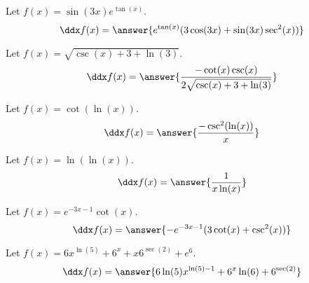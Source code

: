 \documentclass{ximera}
\begin{document}
\begin{shuffle}
\begin{exercise}
Let $f(x)=\sin (3 x) e^{\tan (x)}$.
\[
\ddx f(x) = \answer{e^{\tan (x)} (3 \cos (3 x)+\sin (3 x) \sec ^2(x))}
\]
\end{exercise}

\begin{exercise}
Let $f(x)=\sqrt{\csc (x)+3+\ln (3)}$.
\[
\ddx f(x) = \answer{\frac{-\cot (x) \csc (x)}{2 \sqrt{\csc (x)+3+\ln (3)}}}
\]
\end{exercise}

\begin{exercise}
Let $f(x)=\cot (\ln (x))$.
\[
\ddx f(x) = \answer{\frac{-\csc ^2(\ln (x))}{x}}
\]
\end{exercise}

\begin{exercise}
Let $f(x)=\ln (\ln (x))$.
\[
\ddx f(x) = \answer{\frac{1}{x \ln (x)}}
\]
\end{exercise}

\begin{exercise}
Let $f(x)=e^{-3 x-1} \cot (x)$.
\[
\ddx f(x) = \answer{-e^{-3 x-1} (3 \cot (x)+\csc ^2(x))}
\]
\end{exercise}



\begin{exercise}
Let $f(x)=6 x^{\ln (5)}+6^x+x 6^{\sec (2)}+e^6$.
\[
\ddx f(x) = \answer{6 \ln (5) x^{\ln (5)-1}+6^x \ln (6)+6^{\sec (2)}}
\]
\end{exercise}




\end{shuffle}
\end{document}
